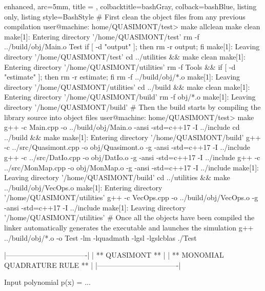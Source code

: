 \documentclass[a4paper, twosided]{book}
\begin{document}
\vspace{0.5cm}
\begin{tcblisting}{enhanced,
                   arc=5mm,
                   title = \color{black}{\large \ttfamily Compilation and Linking of the library},
                   colbacktitle=bashGray,
                   colback=bashBlue,
                   listing only,
                   listing style=BashStyle}
# First clean the object files from any previous compilation
user@machine: home/QUASIMONT/test> make allclean
make clean
make[1]: Entering directory '/home/QUASIMONT/test'
rm -f ../build/obj/Main.o Test
if [ -d "output" ]; then rm -r output; fi 
make[1]: Leaving directory '/home/QUASIMONT/test'
cd ../utilities && make clean
make[1]: Entering directory '/home/QUASIMONT/utilities'
rm -f Tools && if [ -d "estimate" ]; then rm -r estimate; fi
rm -f ../build/obj/*.o
make[1]: Leaving directory '/home/QUASIMONT/utilities'
cd ../build && make clean
make[1]: Entering directory '/home/QUASIMONT/build'
rm -f obj/*.o
make[1]: Leaving directory '/home/QUASIMONT/build'
# Then the build starts by compiling the library source into object files
user@machine: home/QUASIMONT/test> make
g++ -c Main.cpp -o ../build/obj/Main.o -ansi -std=c++17 -I ../include
cd ../build && make
make[1]: Entering directory '/home/QUASIMONT/build'
g++ -c ../src/Quasimont.cpp -o obj/Quasimont.o -g -ansi -std=c++17 -I ../include 
g++ -c ../src/DatIo.cpp -o obj/DatIo.o -g -ansi -std=c++17 -I ../include 
g++ -c ../src/MonMap.cpp -o obj/MonMap.o -g -ansi -std=c++17 -I ../include 
make[1]: Leaving directory '/home/QUASIMONT/build'
cd ../utilities && make ../build/obj/VecOps.o
make[1]: Entering directory '/home/QUASIMONT/utilities'
g++ -c VecOps.cpp -o ../build/obj/VecOps.o -g -ansi -std=c++17 -I ../include 
make[1]: Leaving directory '/home/QUASIMONT/utilities'
# Once all the objects have been compiled the linker automatically generates the executable and launches the simulation
g++ ../build/obj/*.o -o Test -lm -lquadmath -lgsl -lgslcblas
./Test

    |----------------------------------|
    |          ** QUASIMONT **         |
    |  ** MONOMIAL QUADRATURE RULE **  |
    |----------------------------------|


 Input polynomial p(x) = ...
\end{tcblisting}
\vspace{0.5cm}
\end{document}
